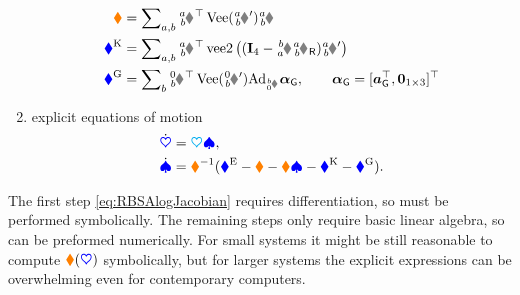 \begin{enumerate}
\begin{subequations}
\begin{align}
 \sysDissMat &= \sumBodiesAB \bodyJac{\BidxI}{\BidxII}^\top \veeMatOp(\bodyDissMatp{\BidxI}{\BidxII}) \bodyJac{\BidxI}{\BidxII}
\\
 \genForceStiff &= \sumBodiesAB \bodyJac{\BidxI}{\BidxII}^\top \veeTwoOp \big( (\idMat[4] - \bodyHomoCoord{\BidxII}{\BidxI} \bodyHomoCoordR{\BidxI}{\BidxII}) \bodyStiffMatp{\BidxI}{\BidxII} \big)
\\
 \genForceGravity &= \sumBodies \bodyJac{0}{\BidxII}^\top \veeMatOp(\bodyInertiaMatp{0}{\BidxII}) \Ad{\bodyHomoCoord{\BidxII}{0}} \gravityAccWrench, \qquad \gravityAccWrench = [\gravityAcc^\top, \tuple{0}_{1\times3}]^\top
\end{align}
\end{subequations} 
\item explicit equations of motion
\begin{subequations}
\begin{align}
 \dot{\boldsymbol{\textcolor{blue}{\heartsuit}}} &= \boldsymbol{\textcolor{cyan}{\heartsuit}} \boldsymbol{\textcolor{blue}{\spadesuit}}, 
\\
 \dot{\boldsymbol{\textcolor{blue}{\spadesuit}}} &= \boldsymbol{\textcolor{orange}{\blacklozenge}}^{-1}(\boldsymbol{\textcolor{blue}{\blacklozenge}}^{\mathrm{E}} - \boldsymbol{\textcolor{orange}{\blacklozenge}} - \boldsymbol{\textcolor{orange}{\blacklozenge}}\boldsymbol{\textcolor{blue}{\spadesuit}} - \boldsymbol{\textcolor{blue}{\blacklozenge}}^{\mathrm{K}} - \boldsymbol{\textcolor{blue}{\blacklozenge}}^{\mathrm{G}}).
\end{align}
\end{subequations} 
\end{enumerate}

The first step \eqref{eq:RBSAlogJacobian} requires differentiation, so must be performed symbolically.
The remaining steps only require basic linear algebra, so can be preformed numerically.
For small systems it might be still reasonable to compute $\boldsymbol{\textcolor{orange}{\blacklozenge}}(\boldsymbol{\textcolor{blue}{\heartsuit}})$ symbolically, but for larger systems the explicit expressions can be overwhelming even for contemporary computers.

